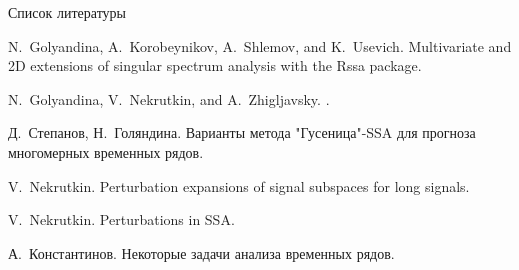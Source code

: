 \documentclass[ucs, notheorems, handout]{beamer}
\begin{document}
\begin{frame}{Список литературы}
\begin{thebibliography}{10}
	
	N.~Golyandina, A.~Korobeynikov, A.~Shlemov, and K.~Usevich.
	\newblock Multivariate and {2D} extensions of singular spectrum analysis with
	the {R}ssa package.
	
	
	N.~Golyandina, V.~Nekrutkin, and A.~Zhigljavsky.
	.

	
	Д.~Степанов, Н.~Голяндина.
	\newblock Варианты метода "Гусеница"{-SSA} для прогноза многомерных временных рядов.

	V.~Nekrutkin.
	\newblock Perturbation expansions of signal subspaces for long signals.

	
	V.~Nekrutkin.
	\newblock Perturbations in SSA.

	
	А.~Константинов.
	\newblock Некоторые задачи анализа временных рядов.

	
\end{thebibliography}
\end{frame}
\end{document}
